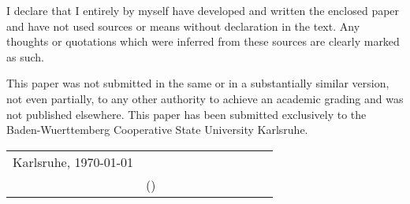 
I declare that I entirely by myself have developed and written the enclosed paper and have not used sources or means without declaration in the text. Any thoughts or quotations which were inferred from these sources are clearly marked as such.

This paper was not submitted in the same or in a substantially similar version, not even partially, to any other authority to achieve an academic grading and was not published elsewhere. This paper has been submitted exclusively to the Baden-Wuerttemberg Cooperative State University Karlsruhe.


\vspace{3cm}

\begin{tabular}{@{}p{0.5\linewidth} @{}p{0.5\linewidth}}
	Karlsruhe, \today \hfill & \hrulefill \\
	\hbox{} & (\myauthor) \\
\end{tabular}


